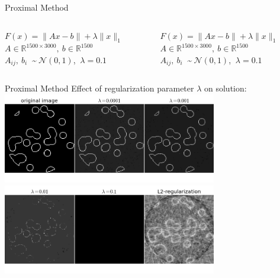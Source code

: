 \documentclass[10pt]{beamer}
\begin{document}
   \begin{frame}{Proximal Method}
   	\begin{columns}[T]
   		\begin{column}{.5\textwidth}
   			$F(x) = \lVert Ax - b \rVert + \lambda \lVert x \rVert_1$\\
   			$A \in \mathbb{R}^{1500 \times 3000},\:b \in \mathbb{R}^{1500}$\\
   			$A_{ij},\:b_i\:$ \textasciitilde $\:\mathcal{N}(0,1)$, $\:\lambda = 0.1$\\
   			\vspace{10pt}
   			\resizebox{\linewidth}{!}{}
   		\end{column}\hfill
   		\begin{column}{.5\textwidth}
   			$F(x) = \lVert Ax - b \rVert + \lambda \lVert x \rVert_1$\\
   			$A \in \mathbb{R}^{1500 \times 3000},\:b \in \mathbb{R}^{1500}$\\
   			$A_{ij},\:b_i\:$ \textasciitilde $\:\mathcal{N}(0,1)$, $\:\lambda = 0.1$\\
   			\vspace{10pt}
   			\resizebox{\linewidth}{!}{}
   		\end{column}
   	\end{columns}
   \end{frame}
   
   \begin{frame}{Proximal Method}
   	\alert{Effect of regularization parameter $\lambda$ on solution:}\\
   	\centering\includegraphics[width = 0.7\textwidth]{lambda1.png}\\
   	\centering\includegraphics[width = 0.7\textwidth]{lambda2.png}
   \end{frame}
\end{document}
